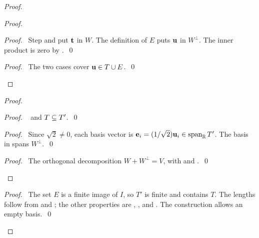 \begin{mergedproofsection}
\begin{proof}
\begin{proof}
 \begin{proof}\pf\ Step  and
  put ${\mathbf t}$ in $W$.
 The definition of $E$ puts ${\mathbf u}$ in $W^\perp$.
 The inner product is zero by
 .~\qed\end{proof}
 \qedstep
 \begin{proof}\pf\ The two cases cover ${\mathbf u}\in T\cup E$.~\qed\end{proof}
\end{proof}
\begin{proof}
 \begin{proof}\pf\  and $T\subseteq T'$.~\qed\end{proof}
 \begin{proof}\pf\ Since $\sqrt2\ne0$, each basis vector is
 ${\mathbf e}_i=(1/\sqrt2){\mathbf u}_i\in\mathop{\mathrm{span}}\nolimits_{{\mathbb R}}T'$.
 The basis in  spans $W^\perp$.~\qed\end{proof}
 \qedstep
 \begin{proof}\pf\ The orthogonal decomposition $W+W^\perp=V$,
 with  and .~\qed\end{proof}
\end{proof}
\qedstep
\begin{proof}\pf\ The set $E$ is a finite image of $I$, so $T'$ is
finite and contains $T$. The lengths follow from  and
; the other properties are
, , and
. The construction allows an empty basis.~\qed\end{proof}
\end{proof}


\end{mergedproofsection}
